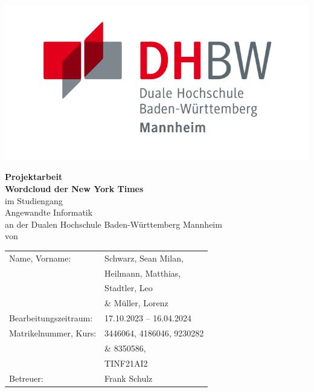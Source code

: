 \begin{titlepage}
	\begin{minipage}{\textwidth}
		\vspace{-2cm}
		\noindent  \hfill   \includegraphics{images/DHBW_MA_Logo.jpg}
	\end{minipage}
	\vspace{1em}
	\begin{center}
		\large

		\textbf{Projektarbeit}\\
		\vspace{2em}
		\textbf{Wordcloud der New York Times}\\
		\vspace{2em}
		im Studiengang\\[1.5mm]
		Angewandte Informatik\\
		\vspace{2em}
		an der Dualen Hochschule Baden-W\"urttemberg Mannheim\\[1.5mm]
		von\\[1.5mm]
		\vfill
		\begin{table}[H]
			\centering
			\large
			\begin{tabular}{p{7.5cm} p{7cm}}
				Name, Vorname: 		    & Schwarz, Sean Milan,\\
										& Heilmann, Matthias,\\
										& Stadtler, Leo\\
										& \& Müller, Lorenz \\
				Bearbeitungszeitraum:   & 17.10.2023 -- 16.04.2024 \\
				Matrikelnummer, Kurs:   & 3446064, 4186046, 9230282 \\
										& \& 8350586,\\
										& TINF21AI2      \\
				Betreuer:  			    & Frank Schulz \\
			\end{tabular}
		\end{table}
	\end{center}
\end{titlepage}